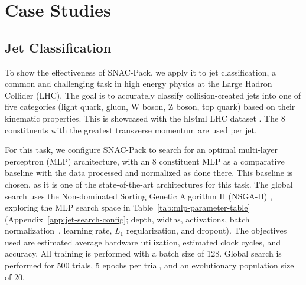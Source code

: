 \documentclass[11pt]{article}
\begin{document}
\section{Case Studies}
\label{sec:case-studies}

\subsection{Jet Classification}

To show the effectiveness of SNAC-Pack, we apply it to jet classification, a common and challenging task in high energy physics at the Large Hadron Collider (LHC).
The goal is to accurately classify collision-created jets into one of five categories (light quark, gluon, W boson, Z boson, top quark) based on their kinematic properties.
This is showcased with the hls4ml LHC dataset \cite{pierini_2020_3602260}.
The 8 constituents with the greatest transverse momentum are used per jet.

For this task, we configure SNAC-Pack to search for an optimal multi-layer perceptron (MLP) architecture, with an 8 constituent MLP as a comparative baseline \cite{Odagiu_2024} with the data processed and normalized as done there.
This baseline is chosen, as it is one of the state-of-the-art architectures for this task.
The global search uses the Non-dominated Sorting Genetic Algorithm II (NSGA-II) \cite{NSGA}, exploring the MLP search space in Table~\ref{tab:mlp-parameter-table} (Appendix~\ref{app:jet-search-config}; depth, widths, activations, batch normalization~\cite{ioffe2015batch}, learning rate, $L_1$ regularization, and dropout).
The objectives used are estimated average hardware utilization, estimated clock cycles, and accuracy. All training is performed with a batch size of 128. Global search is performed for 500 trials, 5 epochs per trial, and an evolutionary population size of 20.

\end{document}
